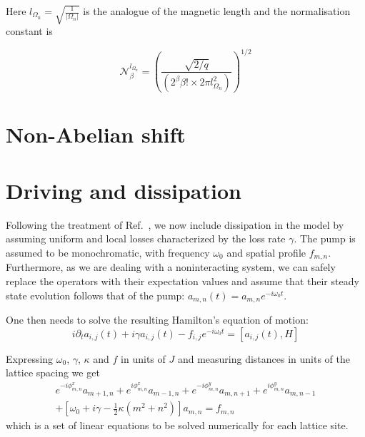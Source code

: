 \documentclass[twocolumn, 10pt, aps, superscriptaddress, floatfix, showpacs, pra, citeautoscript]{revtex4-1}
\begin{document}
Here $l_{\Omega_n} = \sqrt{\frac{1}{|\Omega_n|}}$ is the analogue of
the magnetic length and the normalisation constant is

\begin{equation}
\mathcal{N}_\beta^{l_{\Omega_n}} = \left( \frac{\sqrt{2/q}} {(2^\beta
\beta! \times 2 \pi l_{\Omega_n}^2)} \right)^{1/2}
\end{equation}


\section{Non-Abelian shift}\label{sec:non-abelian-shift}

\section{Driving and dissipation}\label{sec:driven-dissipation}

Following the treatment of Ref.~, we now
include dissipation in the model by assuming uniform and local losses
characterized by the loss rate $\gamma$. The pump is assumed to be
monochromatic, with frequency $\omega_0$ and spatial profile
$f_{m,n}$.  Furthermore, as we are dealing with a noninteracting
system, we can safely replace the operators with their expectation
values and assume that their steady state evolution follows that of
the pump: $a_{m,n}(t) = a_{m,n} e^{-i \omega_0 t}$.

One then needs to solve the resulting Hamilton's equation of motion:
%
\begin{equation}
i\partial_{t}a_{i,j}(t)+i\gamma
a_{i,j}(t)-f_{i,j}e^{-i\omega_{0}t}=\left[a_{i,j}(t),H\right]
\end{equation}

Expressing $\omega_{0}$, $\gamma$, $\kappa$ and $f$ in units of $J$
and measuring distances in units of the lattice spacing we get
%
\begin{multline}\label{eq:linear_problem}
e^{-i\phi_{m,n}^x}a_{m+1,n}+e^{i\phi_{m,n}^x}a_{m-1,n}+e^{-i\phi_{m,n}^y}a_{m,n+1}+e^{i\phi_{m,n}^y}a_{m,n-1}\\
+\left[\omega_{0}+i\gamma-\frac{1}{2}\kappa
(m^{2}+n^{2})\right]a_{m,n}=f_{m,n}
\end{multline}
which is a set of linear equations to be solved numerically for each
lattice site.
\end{document}
